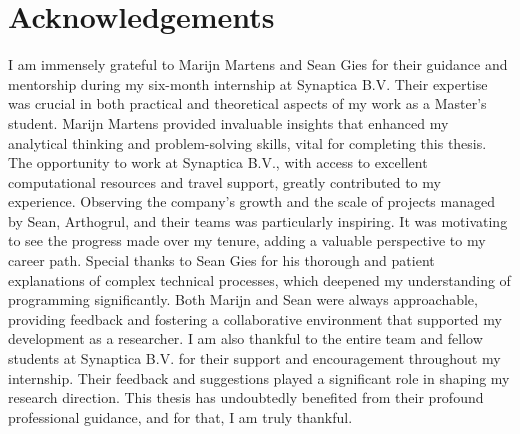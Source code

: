 \section*{Acknowledgements}
I am immensely grateful to Marijn Martens and Sean Gies for their guidance and
mentorship during my six-month internship at Synaptica B.V. Their expertise
was crucial in both practical and theoretical aspects of my work as a
Master's student.
Marijn Martens provided invaluable insights that enhanced my analytical thinking
and problem-solving skills, vital for completing this thesis. The opportunity to
work at Synaptica B.V., with access to excellent computational resources and
travel support, greatly contributed to my experience.
Observing the company's growth and the scale of projects managed by Sean,
Arthogrul, and their teams was particularly inspiring. It was motivating to see
the progress made over my tenure, adding a valuable perspective to my career
path.
Special thanks to Sean Gies for his thorough and patient explanations of complex
technical processes, which deepened my understanding of programming significantly.
Both Marijn and Sean were always approachable, providing feedback and fostering
a collaborative environment that supported my development as a researcher.
I am also thankful to the entire team and fellow students at Synaptica B.V. for
their support and encouragement throughout my internship. Their feedback
and suggestions played a significant role in shaping my research direction.
This thesis has undoubtedly benefited from their profound professional guidance,
and for that, I am truly thankful.